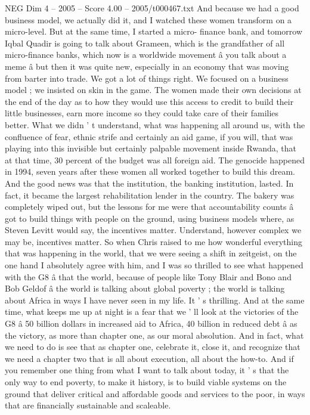 \begin{textsample}{NEG Dim 4 – 2005 – Score 4.00 – 2005/t000467.txt}
And because we had a good business model, we actually did it, and I watched these women transform on a micro-level.
But at the same time, I started a micro- finance bank, and tomorrow Iqbal Quadir is going to talk about Grameen, which is the grandfather of all micro-finance banks, which now is a worldwide movement â you talk about a meme â but then it was quite new, especially in an economy that was moving from barter into trade.
We got a lot of things right.
We focused on a business model ; we insisted on skin in the game.
The women made their own decisions at the end of the day as to how they would use this access to credit to build their little businesses, earn more income so they could take care of their families better.
What we didn ' t understand, what was happening all around us, with the confluence of fear, ethnic strife and certainly an aid game, if you will, that was playing into this invisible but certainly palpable movement inside Rwanda, that at that time, 30 percent of the budget was all foreign aid.
The genocide happened in 1994, seven years after these women all worked together to build this dream.
And the good news was that the institution, the banking institution, lasted.
In fact, it became the largest rehabilitation lender in the country.
The bakery was completely wiped out, but the lessons for me were that accountability counts â got to build things with people on the ground, using business models where, as Steven Levitt would say, the incentives matter.
Understand, however complex we may be, incentives matter.
So when Chris raised to me how wonderful everything that was happening in the world, that we were seeing a shift in zeitgeist, on the one hand I absolutely agree with him, and I was so thrilled to see what happened with the G8 â that the world, because of people like Tony Blair and Bono and Bob Geldof â the world is talking about global poverty ; the world is talking about Africa in ways I have never seen in my life.
It ' s thrilling.
And at the same time, what keeps me up at night is a fear that we ' ll look at the victories of the G8 â 50 billion dollars in increased aid to Africa, 40 billion in reduced debt â as the victory, as more than chapter one, as our moral absolution.
And in fact, what we need to do is see that as chapter one, celebrate it, close it, and recognize that we need a chapter two that is all about execution, all about the how-to.
And if you remember one thing from what I want to talk about today, it ' s that the only way to end poverty, to make it history, is to build viable systems on the ground that deliver critical and affordable goods and services to the poor, in ways that are financially sustainable and scaleable.

\end{textsample}
